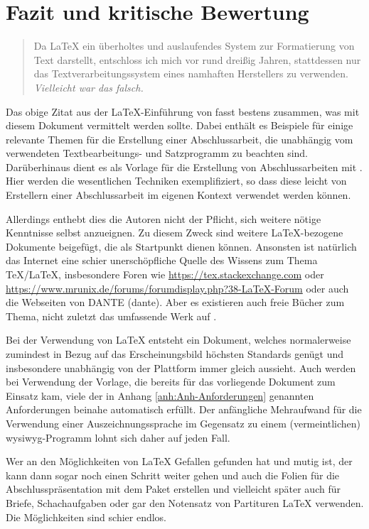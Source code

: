 \chapter{Fazit und kritische Bewertung}
\label{cha:Fazit}
%
\begin{quote}
\glqq 
Da \LaTeX{} ein überholtes und auslaufendes System zur Formatierung
von Text darstellt, entschloss ich mich vor rund dreißig Jahren, stattdessen
nur das Textverarbeitungssystem eines namhaften Herstellers zu
verwenden. \emph{Vielleicht war das falsch.}\grqq
\end{quote}
%
Das obige Zitat aus der \LaTeX{}-Einführung von \textcite{Gitter2018} fasst bestens zusammen, was mit
diesem Dokument vermittelt werden sollte. Dabei 
enthält es Beispiele für einige relevante Themen für die Erstellung einer Abschlussarbeit, die
unabhängig vom verwendeten Textbearbeitungs- und Satzprogramm zu beachten sind. Darüberhinaus dient es als
Vorlage für die Erstellung von Abschlussarbeiten mit \LaTeXe{}. Hier werden die wesentlichen Techniken
exemplifiziert, so dass diese leicht von Erstellern einer Abschlussarbeit im eigenen Kontext verwendet
werden können.

Allerdings enthebt dies die Autoren nicht der Pflicht, sich weitere nötige Kenntnisse selbst anzueignen. Zu
diesem Zweck sind weitere \LaTeX{}-bezogene Dokumente beigefügt, die als Startpunkt dienen können. Ansonsten ist
natürlich das Internet eine schier unerschöpfliche Quelle des Wissens zum Thema \TeX{}/\LaTeX{}, insbesondere
Foren wie \url{https://tex.stackexchange.com} oder 
\url{https://www.mrunix.de/forums/forumdisplay.php?38-LaTeX-Forum} oder auch die Webseiten von
DANTE (\gls{dante}). Aber es existieren auch freie Bücher zum Thema, nicht zuletzt das umfassende Werk
auf \textcite{Wikibooks2018}.

Bei der Verwendung von \LaTeX{} entsteht ein Dokument, welches normalerweise zumindest in Bezug auf das
Erscheinungsbild höchsten 
Standards genügt und insbesondere unabhängig von der Plattform immer gleich aussieht. Auch werden bei
Verwendung der Vorlage, die bereits für das vorliegende Dokument zum Einsatz kam, viele der in
Anhang \ref{anh:Anh-Anforderungen} genannten Anforderungen beinahe automatisch erfüllt. Der anfängliche
Mehraufwand für die Verwendung einer Auszeichnungssprache im Gegensatz zu einem (vermeintlichen)
\gls{wysiwyg}-Programm lohnt sich daher auf jeden Fall.

Wer an den Möglichkeiten von \LaTeX{} Gefallen gefunden hat und mutig ist, der kann dann sogar noch einen
Schritt weiter gehen und auch die Folien für die Abschlusspräsentation mit dem Paket 
erstellen und vielleicht später auch für Briefe, Schachaufgaben oder gar den Notensatz von Partituren \LaTeX{} verwenden.
Die Möglichkeiten sind schier endlos.